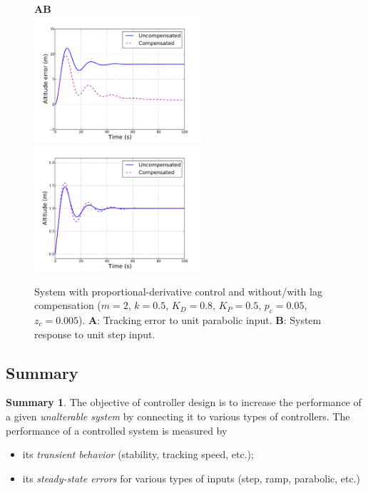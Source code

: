 \documentclass[a4paper,11pt]{report}
\theoremstyle{definition}
\newtheorem{mdsummary}{Summary}
\newenvironment{summary}%
  {\vspace{0.1cm}\begin{mdframed}[linecolor=red!60!black,
  linewidth=2pt]\begin{mdsummary}}%
  {\end{mdsummary}\end{mdframed}\vspace{0.1cm}}
\begin{document}
\label{sec:laghelico}
\begin{figure}[H]
  \centering
  \textbf{A}\hspace{6cm}\textbf{B}\\
  \includegraphics[width=6.2cm]{fig/paraberrcomp.pdf}
  \includegraphics[width=6.2cm]{fig/steprescomp.pdf}
  \caption{System with proportional-derivative control and
    without/with lag compensation ($m=2$, $k=0.5$, $K_D=0.8$,
    $K_P=0.5$, $p_c=0.05$, $z_c=0.005$). \textbf{A}: Tracking error to
    unit parabolic input. \textbf{B}: System response to unit step
    input.}
  \label{fig:lag}
\end{figure}


\subsection{Summary}


\begin{summary}
  \label{sum:obj}
  The objective of controller design is to increase the performance of
  a given \emph{unalterable system} by connecting it to various types
  of controllers. The performance of a controlled system is measured
  by
  \begin{itemize}
  \item its \emph{transient behavior} (stability, tracking speed, etc.);
  \item its \emph{steady-state errors} for various types of inputs
    (step, ramp, parabolic, etc.)
  \end{itemize}
\end{summary}
\end{document}
